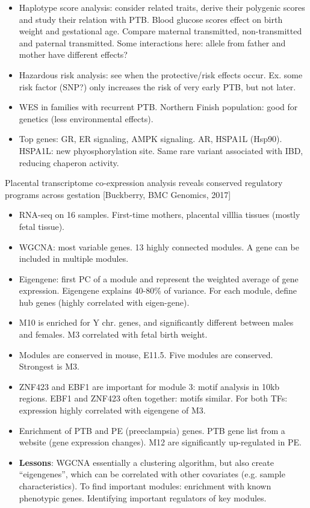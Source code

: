 \documentclass{report}
\begin{document}
\begin{itemize}
	\item Haplotype score analysis: consider related traits, derive their polygenic scores and study their relation with PTB. Blood glucose scores effect on birth weight and gestational age. Compare maternal transmitted, non-transmitted and paternal transmitted. Some interactions here:  allele from father and mother have different effects?
	
	\item Hazardous risk analysis: see when the protective/risk effects occur. Ex. some risk factor (SNP?) only increases the risk of very early PTB, but not later.
	
	\item WES in families with recurrent PTB. Northern Finish population: good for genetics (less environmental effects).
	
	\item Top genes: GR, ER signaling, AMPK signaling. AR, HSPA1L (Hsp90). HSPA1L: new phyosphorylation site. Same rare variant associated with IBD, reducing chaperon activity.
\end{itemize}

Placental transcriptome co-expression analysis reveals conserved regulatory programs across gestation [Buckberry, BMC Genomics, 2017]
\begin{itemize}
	\item RNA-seq on 16 samples. First-time mothers, placental villlia tissues (mostly fetal tissue).
	
	\item WGCNA: most variable genes. 13 highly connected modules. A gene can be included in multiple modules.
	
	\item Eigengene: first PC of a module and represent the weighted average of gene expression. Eigengene explains 40-80\% of variance. For each module, define hub genes (highly correlated with eigen-gene).
	
	\item M10 is enriched for Y chr. genes, and significantly different between males and females. M3 correlated with fetal birth weight.
	
	\item Modules are conserved in mouse, E11.5. Five modules are conserved. Strongest is M3.
	
	\item ZNF423 and EBF1 are important for module 3: motif analysis in 10kb regions. EBF1 and ZNF423 often together: motifs similar. For both TFs: expression highly correlated with eigengene of M3.
	
	\item Enrichment of PTB and PE (preeclampsia) genes. PTB gene list from a website (gene expression changes). M12 are significantly up-regulated in PE.
	
	\item \textbf{Lessons}: WGCNA essentially a clustering algorithm, but also create “eigengenes”, which can be correlated with other covariates (e.g. sample characteristics). To find important modules: enrichment with known phenotypic genes. Identifying important regulators of key modules.
\end{itemize}
\end{document}

